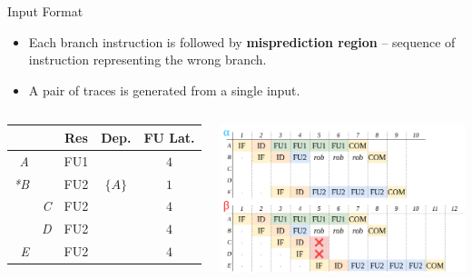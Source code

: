 \documentclass{beamer}
\begin{document}
\begin{frame}{Input Format}

\begin{itemize}
    \item Each branch instruction is followed by \textbf{misprediction region} -- sequence of instruction representing the wrong branch.
    \item A pair of traces is generated from a single input.
\end{itemize}

\begin{columns}
        \small
        \begin{tabular}{rr|ccc}
         &  & Res & Dep. & FU Lat. \\ \hline
        \textit{A} &  & FU1 &  & $4$ \\
        \textit{*B} &  & FU2 & $\{A\}$ & $1$ \\
        & \textit{C} & FU2 &  & $4$ \\
        & \textit{D} & FU2 &  & $4$ \\
        \textit{E} &  & FU2 &  & $4$ \\
        \end{tabular}

        \includegraphics[width=\textwidth]{pic/mispred-intro.png}
\end{columns}

\end{frame}
\end{document}
